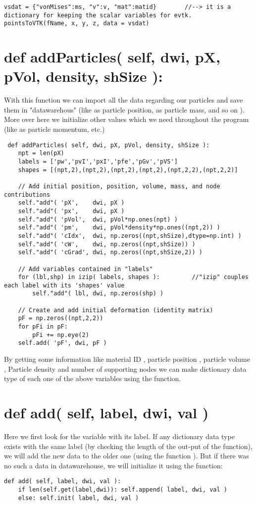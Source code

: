 \begin{lstlisting}
vsdat = {"vonMises":ms, "v":v, "mat":matid}        //--> it is a dictionary for keeping the scalar variables for evtk.
pointsToVTK(fName, x, y, z, data = vsdat)
\end{lstlisting}

\section{def addParticles( self, dwi, pX, pVol, density, shSize ):}
With this function we can import all the data regarding our particles and save them in "datawarehous" (like  as particle position,  as particle mass, and so on ). More over here we initialize other values which we need throughout the program (like  as particle momentum, etc.)
\begin{lstlisting} 
 def addParticles( self, dwi, pX, pVol, density, shSize ):
	npt = len(pX)
	labels = ['pw','pvI','pxI','pfe','pGv','pVS']
	shapes = [(npt,2),(npt,2),(npt,2),(npt,2),(npt,2,2),(npt,2,2)]

	// Add initial position, position, volume, mass, and node contributions
	self."add"( 'pX',    dwi, pX )
	self."add"( 'px',    dwi, pX )
	self."add"( 'pVol',  dwi, pVol*np.ones(npt) )
	self."add"( 'pm',    dwi, pVol*density*np.ones((npt,2)) )             
	self."add"( 'cIdx',  dwi, np.zeros((npt,shSize),dtype=np.int) )
	self."add"( 'cW',    dwi, np.zeros((npt,shSize)) )
	self."add"( 'cGrad', dwi, np.zeros((npt,shSize,2)) )		

	// Add variables contained in "labels"
	for (lbl,shp) in izip( labels, shapes ):         //"izip" couples each label with its 'shapes' value
	    self."add"( lbl, dwi, np.zeros(shp) )
	
	// Create and add initial deformation (identity matrix)
	pF = np.zeros((npt,2,2))
	for pFi in pF:
	    pFi += np.eye(2)
	self.add( 'pF', dwi, pF )
\end{lstlisting}
By getting some information like material ID , particle position , particle volume , Particle density  and number of supporting nodes  we can make dictionary data type of each one of the above variables using the {} function.
\section{ def add( self, label, dwi, val )}
Here we first look for the variable with its label. If any dictionary data type exists with the same label (by checking the length of the out-put of the {} function), we will add the new data to the older one (using the {} function ). But if there was no such a data in datawarehouse, we will initialize it using the {} function:
\begin{lstlisting}
def add( self, label, dwi, val ):
	if len(self.get(label,dwi)): self.append( label, dwi, val )
	else: self.init( label, dwi, val )
\end{lstlisting}
